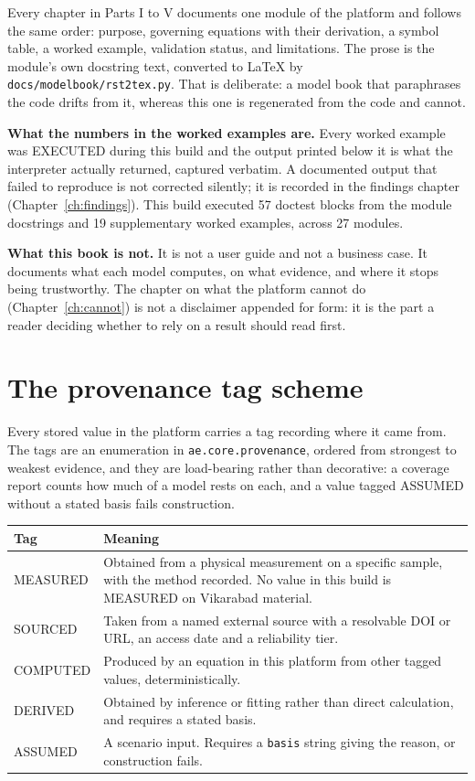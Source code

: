\documentclass[10pt,a4paper,twoside]{report}
\newcommand{\provtag}[1]{{\small\textsc{#1}}}
\begin{document}
Every chapter in Parts I to V documents one module of the platform and follows the same order: purpose, governing equations with their derivation, a symbol table, a worked example, validation status, and limitations. The prose is the module's own docstring text, converted to LaTeX by \texttt{docs/modelbook/rst2tex.py}. That is deliberate: a model book that paraphrases the code drifts from it, whereas this one is regenerated from the code and cannot.

\textbf{What the numbers in the worked examples are.} Every worked example was EXECUTED during this build and the output printed below it is what the interpreter actually returned, captured verbatim. A documented output that failed to reproduce is not corrected silently; it is recorded in the findings chapter (Chapter~\ref{ch:findings}). This build executed 57 doctest blocks from the module docstrings and 19 supplementary worked examples, across 27 modules.

\textbf{What this book is not.} It is not a user guide and not a business case. It documents what each model computes, on what evidence, and where it stops being trustworthy. The chapter on what the platform cannot do (Chapter~\ref{ch:cannot}) is not a disclaimer appended for form: it is the part a reader deciding whether to rely on a result should read first.

\section*{The provenance tag scheme}

Every stored value in the platform carries a tag recording where it came from. The tags are an enumeration in \texttt{ae.core.provenance}, ordered from strongest to weakest evidence, and they are load-bearing rather than decorative: a coverage report counts how much of a model rests on each, and a value tagged ASSUMED without a stated basis fails construction.

\begin{center}\footnotesize
\begin{tabular}{@{}lp{}@{}}
\toprule
Tag & Meaning \\
\midrule
\provtag{MEASURED} & Obtained from a physical measurement on a specific sample, with the method recorded. No value in this build is MEASURED on Vikarabad material. \\
\provtag{SOURCED} & Taken from a named external source with a resolvable DOI or URL, an access date and a reliability tier. \\
\provtag{COMPUTED} & Produced by an equation in this platform from other tagged values, deterministically. \\
\provtag{DERIVED} & Obtained by inference or fitting rather than direct calculation, and requires a stated basis. \\
\provtag{ASSUMED} & A scenario input. Requires a \texttt{basis} string giving the reason, or construction fails. \\
\bottomrule
\end{tabular}
\end{center}
\end{document}
